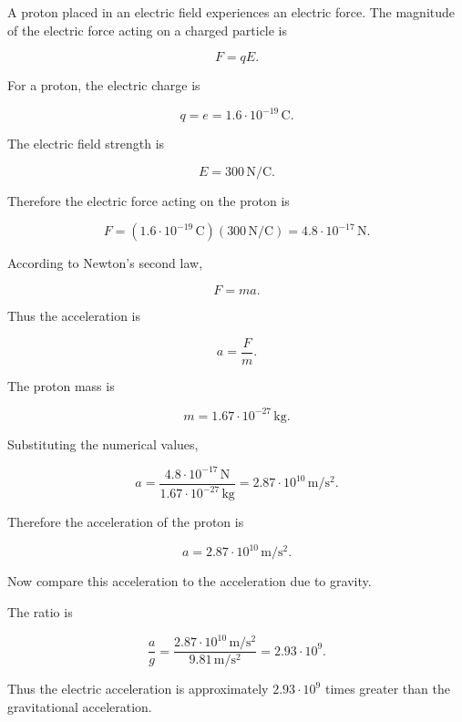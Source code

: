 \documentclass[letterpaper,12pt]{letter}
\begin{document}
\begin{enumerate}[label=\Roman*.]
\begin{enumerate}[label=\arabic*.]
\begin{center}
\end{center}

A proton placed in an electric field experiences an electric force. The magnitude of the electric force acting on a charged particle is

$$F=qE.$$

For a proton, the electric charge is

$$q=e=1.6\cdot10^{-19}\,\mathrm{C}.$$

The electric field strength is

$$E=300\,\mathrm{N/C}.$$

Therefore the electric force acting on the proton is

$$F=(1.6\cdot10^{-19}\,\mathrm{C})(300\,\mathrm{N/C})=4.8\cdot10^{-17}\,\mathrm{N}.$$

According to Newton's second law,

$$F=ma.$$

Thus the acceleration is

$$a=\frac{F}{m}.$$

The proton mass is

$$m=1.67\cdot10^{-27}\,\mathrm{kg}.$$

Substituting the numerical values,

$$a=\frac{4.8\cdot10^{-17}\,\mathrm{N}}{1.67\cdot10^{-27}\,\mathrm{kg}}=2.87\cdot10^{10}\,\mathrm{m/s^2}.$$

Therefore the acceleration of the proton is

$$\boxed{a=2.87\cdot10^{10}\,\mathrm{m/s^2}}.$$

Now compare this acceleration to the acceleration due to gravity.

The ratio is

$$\frac{a}{g}=\frac{2.87\cdot10^{10}\,\mathrm{m/s^2}}{9.81\,\mathrm{m/s^2}}=2.93\cdot10^9.$$

Thus the electric acceleration is approximately $\boxed{2.93\cdot10^9}$ times greater than the gravitational acceleration.



\end{enumerate}
\end{enumerate}
\end{document}
